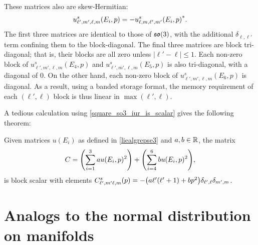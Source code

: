 \documentclass[../../main.tex]{subfiles}
\begin{document}
\begin{refsection}
	These matrices also are skew-Hermitian:
	$$u^s_{\ell',m',\ell,m}(E_i, p) = -{u^s_{\ell,m,\ell',m'}(E_i, p)}^*.$$
	The first three matrices are identical to those of $\mathfrak{so} (3)$, with the additional $\delta_{\ell,\ell'}$ term confining them to the block-diagonal.
	The final three matrices are block tri-diagonal; that is, their blocks are all zero unless $|\ell' - \ell| \le 1$.
	Each non-zero block of $u^s_{\ell', m' , \ell, m}(E_4 , p)$ and $u^s_{\ell', m' , \ell, m}(E_5 , p)$ is also tri-diagonal, with a diagonal of 0.
	On the other hand, each non-zero block of $u^s_{\ell', m' , \ell, m}(E_6 , p)$ is diagonal.
	As a result, using a banded storage format, the memory requirement of each $(\ell',\ell)$ block is thus linear in $\max(\ell', \ell)$.

	A tedious calculation using \cref{square_so3_iur_is_scalar} gives the following theorem:
	\begin{theorem}\label{square_se3_iur_is_scalar}
		Given matrices $u(E_i)$ as defined in \cref{liealgrepse3} and $a,b \in \mathbb{R}$, the matrix
		$$C = \qty(\sum_{i=1}^3 a u(E_i, p)^2) + \qty(\sum_{i=4}^6 b u(E_i, p)^2),$$
		is block scalar with elements $C^s_{\ell',m'\ell,m}(p) = -\qty(a \ell' (\ell' + 1) + b p^2) \delta_{\ell',\ell} \delta_{m',m}$.
	\end{theorem}

	\section{Analogs to the normal distribution on manifolds}\label{analogs-to-the-normal-distribution-on-manifolds}


\end{refsection}
\end{document}
